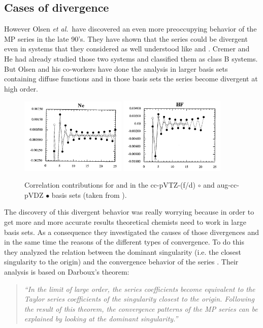 \documentclass[11pt,a4paper]{article}
\begin{document}
\subsection{Cases of divergence}

However Olsen \textit{et al.}~have discovered an even more preoccupying behavior of the MP series in the late 90's. They have shown that the series could be divergent even in systems that they considered as well understood like  and  \cite{Olsen_1996, Christiansen_1996}. Cremer and He had already studied those two systems and classified them as class B systems. But Olsen and his co-workers have done the analysis in larger basis sets containing diffuse functions and in those basis sets the series become divergent at high order.

\begin{figure}[h!]
    \centering
    \includegraphics[width=0.45\textwidth]{Nedivergence.png}
    \includegraphics[width=0.45\textwidth]{HFdivergence.png}
    \caption{\centering Correlation contributions for  and  in the cc-pVTZ-(f/d) $\circ$ and aug-cc-pVDZ $\bullet$ basis sets (taken from \cite{Olsen_1996}).}
    \label{fig:my_label}
\end{figure}

The discovery of this divergent behavior was really worrying because in order to get more and more accurate results theoretical chemists need to work in large basis sets. As a consequence they investigated the causes of those divergences and in the same time the reasons of the different types of convergence. To do this they analyzed the relation between the dominant singularity (i.e. the closest singularity to the origin) and the convergence behavior of the series \cite{Olsen_2000}. Their analysis is based on Darboux's theorem: 
\begin{quote}
	\textit{``In the limit of large order, the series coefficients become equivalent to the Taylor series coefficients of the singularity closest to the origin. Following the result of this theorem, the convergence patterns of the MP series can be explained by looking at the dominant singularity.''}
\end{quote}
\end{document}
